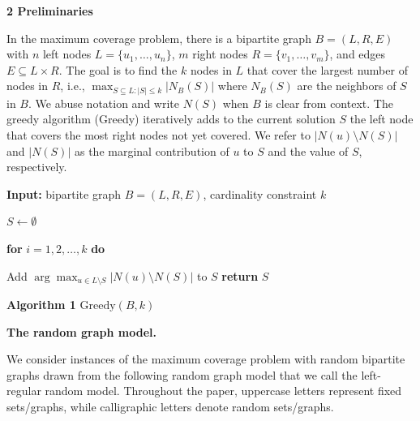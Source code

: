 \documentclass[10pt,a4paper]{article}
\begin{document}
\par\medskip\noindent\textbf{2 Preliminaries}\par




In the maximum coverage problem, there is a bipartite graph $B=(L,R,E)$ with $n$ left nodes $L=\{u_{1},\ldots,u_{n}\}$, $m$ right nodes $R=\{v_{1},\ldots,v_{m}\}$, and edges $E\subseteq L\times R$. The goal is to find the $k$ nodes in $L$ that cover the largest number of nodes in $R$, i.e., $\max_{S\subseteq L:|S|\leq k}|N_{B}(S)|$ where $N_{B}(S)$ are the neighbors of $S$ in $B$. We abuse notation and write $N(S)$ when $B$ is clear from context. The greedy algorithm (Greedy) iteratively adds to the current solution $S$ the left node that covers the most right nodes not yet covered. We refer to $|N(u)\setminus N(S)|$ and $|N(S)|$ as the marginal contribution of $u$ to $S$ and the value of $S$, respectively.\par





            
            
          \textbf{Input:} bipartite graph $B=(L,R,E)$, cardinality constraint $k$



            
            
          $S\leftarrow\emptyset$



            
            
          \textbf{for} $i=1,2,\dots,k$ \textbf{do}



            
            
          \quad \enspace Add $\arg\max_{u\in L\setminus S}|N(u)\setminus N(S)|$ to $S$ \textbf{return} $S$



\textbf{Algorithm 1}  $\text{{Greedy}}(B,k)$



\par\medskip\noindent\textbf{The random graph model.}\par




We consider instances of the maximum coverage problem with random bipartite graphs drawn from the following random graph model that we call the left-regular random model. Throughout the paper, uppercase letters represent fixed sets/graphs, while calligraphic letters denote random sets/graphs.\par
\end{document}
